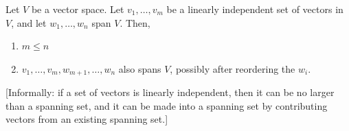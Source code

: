\documentclass[12pt]{article}
\begin{document}
\begin{theorem*}
  Let $V$ be a vector space. Let $v_1, \ldots, v_m$ be a linearly independent
  set of vectors in $V$, and let $w_1, \ldots, w_n$ span $V$. Then,
  \begin{enumerate}[label=\roman*)]
  \item $m \leq n$
  \item $v_1, \ldots, v_m, w_{m+1}, \ldots, w_n$ also spans $V$, possibly after
    reordering the $w_i$.
  \end{enumerate}
\end{theorem*}

[Informally: if a set of vectors is linearly independent, then it can be no
larger than a spanning set, and it can be made into a spanning set by
contributing vectors from an existing spanning set.]
\end{document}
